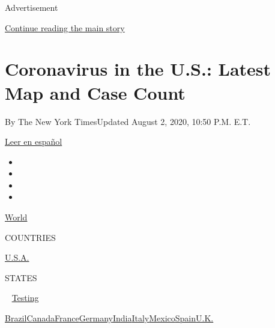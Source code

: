 Advertisement

\protect\hyperlink{after-top}{Continue reading the main story}

\hypertarget{coronavirus-in-the-us-latest-map-and-case-count}{%
\section{Coronavirus in the U.S.: Latest Map and Case
Count}\label{coronavirus-in-the-us-latest-map-and-case-count}}

By The New York TimesUpdated August 2, 2020, 10:50 P.M. E.T.

\href{https://www.nytimes3xbfgragh.onion/es/interactive/2020/espanol/mundo/coronavirus-en-estados-unidos.html}{Leer
en español}

\begin{itemize}
\item
\item
\item
\item
\end{itemize}

\href{https://www.nytimes3xbfgragh.onion/interactive/2020/world/coronavirus-maps.html}{World}~

COUNTRIES

\textbar{}
\href{https://www.nytimes3xbfgragh.onion/interactive/2020/us/coronavirus-us-cases.html}{U.S.A.}~

STATES

~
\href{https://www.nytimes3xbfgragh.onion/interactive/2020/us/coronavirus-testing.html}{Testing}

\href{https://www.nytimes3xbfgragh.onion/interactive/2020/world/americas/brazil-coronavirus-cases.html}{Brazil}\href{https://www.nytimes3xbfgragh.onion/interactive/2020/world/canada/canada-coronavirus-cases.html}{Canada}\href{https://www.nytimes3xbfgragh.onion/interactive/2020/world/europe/france-coronavirus-cases.html}{France}\href{https://www.nytimes3xbfgragh.onion/interactive/2020/world/europe/germany-coronavirus-cases.html}{Germany}\href{https://www.nytimes3xbfgragh.onion/interactive/2020/world/asia/india-coronavirus-cases.html}{India}\href{https://www.nytimes3xbfgragh.onion/interactive/2020/world/europe/italy-coronavirus-cases.html}{Italy}\href{https://www.nytimes3xbfgragh.onion/interactive/2020/world/americas/mexico-coronavirus-cases.html}{Mexico}\href{https://www.nytimes3xbfgragh.onion/interactive/2020/world/europe/spain-coronavirus-cases.html}{Spain}\href{https://www.nytimes3xbfgragh.onion/interactive/2020/world/europe/united-kingdom-coronavirus-cases.html}{U.K.}

